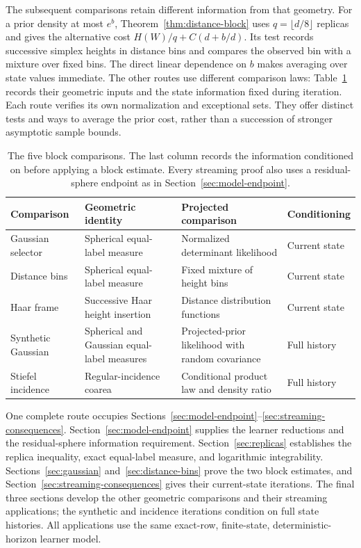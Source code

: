 The subsequent comparisons retain different information from that geometry.
For a prior density at most $e^b$, Theorem~\ref{thm:distance-block} uses
$q=\lfloor d/8\rfloor$ replicas and gives the alternative cost
$H(W)/q+C(d+b/d)$. Its test records successive simplex heights in distance
bins and compares the observed bin with a mixture over fixed bins.
The direct linear dependence on $b$ makes averaging over state values
immediate. The other routes use different comparison laws:
Table~\ref{tab:comparisons} records their geometric inputs and the state
information fixed during iteration. Each route verifies its own
normalization and exceptional sets. They offer distinct tests and ways to
average the prior cost, rather than a succession of stronger asymptotic
sample bounds.

\begin{table}[htbp]
\centering
\small
\setlength{\tabcolsep}{4pt}
\renewcommand{\arraystretch}{1.2}
\begin{tabular}{@{}p{}p{}p{}p{}@{}}
\toprule
Comparison & Geometric identity & Projected comparison & Conditioning \\
\midrule
Gaussian selector & Spherical equal-label measure &
Normalized determinant likelihood & Current state \\
Distance bins & Spherical equal-label measure &
Fixed mixture of height bins & Current state \\
Haar frame & Successive Haar height insertion &
Distance distribution functions & Current state \\
Synthetic Gaussian & Spherical and Gaussian equal-label measures &
Projected-prior likelihood with random covariance & Full history \\
Stiefel incidence & Regular-incidence coarea &
Conditional product law and density ratio & Full history \\
\bottomrule
\end{tabular}
\caption{The five block comparisons. The last column records the information
conditioned on before applying a block estimate. Every streaming proof also
uses a residual-sphere endpoint as in Section~\ref{sec:model-endpoint}.}
\label{tab:comparisons}
\end{table}

One complete route occupies Sections~\ref{sec:model-endpoint}--\ref{sec:streaming-consequences}.
Section~\ref{sec:model-endpoint} supplies the learner reductions and the
residual-sphere information requirement. Section~\ref{sec:replicas}
establishes the replica inequality, exact equal-label measure, and
logarithmic integrability. Sections~\ref{sec:gaussian}
and~\ref{sec:distance-bins} prove the two block estimates, and
Section~\ref{sec:streaming-consequences} gives their current-state
iterations. The final three sections develop the other geometric
comparisons and their streaming applications; the synthetic and incidence
iterations condition on full state histories. All applications use the
same exact-row, finite-state, deterministic-horizon learner model.
